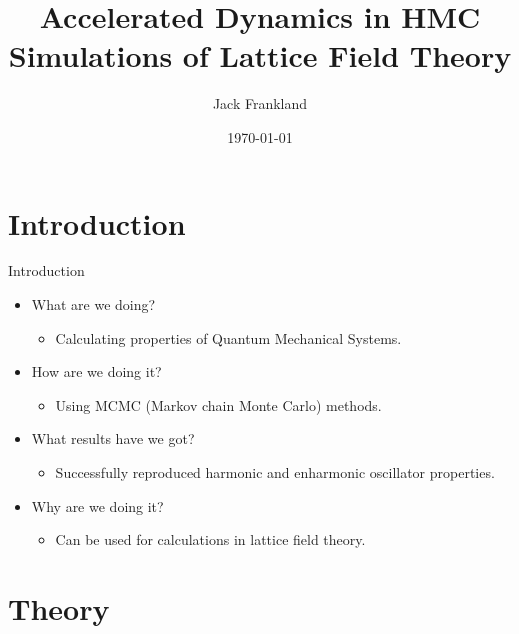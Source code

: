\documentclass{beamer}
\title[Accelerated Dynamics in HMC Simulations of Lattice Field
Theory]{Accelerated Dynamics in HMC Simulations of Lattice Field
Theory}
\author{Jack Frankland}
\institute{University of Edinburgh}
\date{\today{}}
\begin{document}
\begin{frame}
    \titlepage
\end{frame}

\section{Introduction}

\begin{frame}{Introduction}
    \begin{itemize}
  \item<1-> What are we  doing? 
    \begin{itemize}
        \item<2-> Calculating properties of Quantum Mechanical Systems.
    \end{itemize}
  \item<3-> How are we doing it?
    \begin{itemize}
        \item<4-> Using MCMC (Markov chain Monte Carlo) methods.
    \end{itemize}
  \item<5-> What results have we got?
  \begin{itemize}
        \item<6-> Successfully reproduced harmonic and enharmonic oscillator properties.
    \end{itemize}
  \item<7-> Why are we doing it?
  \begin{itemize}
    \item<8-> Can be used for calculations in lattice field theory.
  \end{itemize}
    \end{itemize}
\end{frame}

\section{Theory}
\end{document}
